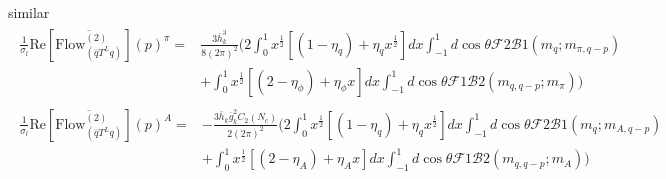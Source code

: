 \documentclass[12pt]{article}
\begin{document}
similar
\begin{eqnarray}
\begin{split}
\frac{1}{\sigma_l} \text{Re} [ \overline{\text{Flow}^{(2)}_{(\bar q T^L q)}}](p)^\pi=&\frac{3\bar h_k^3}{8 (2 \pi)^2}\bigg (2 \int_{0}^{1}  x^{\frac{1}{2}}[(1-\eta_q)+\eta_q x^{\frac{1}{2}}] dx \int_{-1}^{1} d \cos \theta \mathcal{F}2\mathcal{B}1(m_q;m_{\pi,q-p})\\
&+\int_0^1 x^{\frac{1}{2}}[(2-\eta_\phi)+\eta_\phi x] dx\int_{-1}^{1} d\cos \theta \mathcal{F}1\mathcal{B}2(m_{q,q-p};m_{\pi}) \bigg )
\end{split}
\end{eqnarray}
\begin{eqnarray}
\begin{split}
\frac{1}{\sigma_l} \text{Re} [\overline{\text{Flow}^{(2)}_{(\bar q T^L q)}}](p)^A=&-\frac{3\bar h_{k} \bar{g}^2_kC_2(N_c)}{2 (2 \pi)^2}\bigg (2 \int_{0}^{1}  x^{\frac{1}{2}}[(1-\eta_q)+\eta_q x^{\frac{1}{2}}] dx \int_{-1}^{1} d \cos \theta \mathcal{F}2\mathcal{B}1(m_q;m_{A,q-p})\\
&+\int_0^1 x^{\frac{1}{2}}[(2-\eta_A)+\eta_A x] dx\int_{-1}^{1} d\cos \theta \mathcal{F}1\mathcal{B}2(m_{q,q-p};m_{A}) \bigg )
\end{split}
\end{eqnarray}
\end{document}
